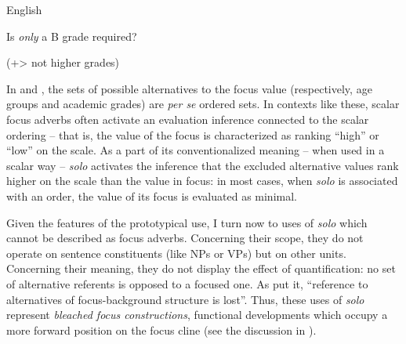 \ea%
    \label{ex:key:90}

          English \citep[96]{König1991}

Is \textit{only} a B grade required?

(+> not higher grades)
    \z %

In  and , the sets of possible alternatives to the focus value (respectively, age groups and academic grades) are \textit{per se} ordered sets. In contexts like these, scalar focus adverbs often activate an evaluation inference connected to the sca\-lar ordering – that is, the value of the focus is characterized as ranking “high” or “low” on the scale. As a part of its conventionalized meaning – when used in a scalar way – \textit{solo} activates the inference that the excluded alternative values rank higher on the scale than the value in focus: in most cases, when \textit{solo} is associated with an order, the value of its focus is evaluated as minimal.

Given the features of the prototypical use, I turn now to uses of \textit{solo} which cannot be described as focus adverbs. Concerning their scope, they do not operate on sentence constituents (like NPs or VPs) but on other units. Concerning their meaning, they do not display the effect of quantification: no set of alternative referents is opposed to a focused one. As \citet[503]{EckardtSpeyer2016} put it, “reference to alternatives of focus-background structure is lost”. Thus, these uses of \textit{solo} represent \textit{bleached focus constructions}, functional developments which occupy a more forward position on the focus cline (see the discussion in ).

